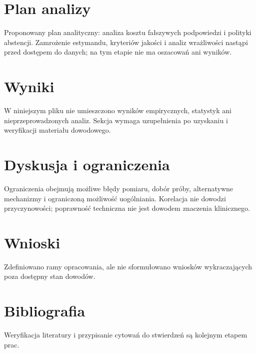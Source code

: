 \documentclass[11pt,a4paper]{article}
\begin{document}
\section{Plan analizy}

Proponowany plan analityczny: analiza kosztu fałszywych podpowiedzi i polityki abstencji. Zamrożenie estymandu, kryteriów jakości i analiz wrażliwości nastąpi przed dostępem do danych; na tym etapie nie ma oszacowań ani wyników.

\section{Wyniki}

W niniejszym pliku nie umieszczono wyników empirycznych, statystyk ani nieprzeprowadzonych analiz. Sekcja wymaga uzupełnienia po uzyskaniu i weryfikacji materiału dowodowego.

\section{Dyskusja i ograniczenia}

Ograniczenia obejmują możliwe błędy pomiaru, dobór próby, alternatywne mechanizmy i ograniczoną możliwość uogólniania. Korelacja nie dowodzi przyczynowości; poprawność techniczna nie jest dowodem znaczenia klinicznego.

\section{Wnioski}

Zdefiniowano ramy opracowania, ale nie sformułowano wniosków wykraczających poza dostępny stan dowodów.

\section*{Bibliografia}

Weryfikacja literatury i przypisanie cytowań do stwierdzeń są kolejnym etapem prac.
\end{document}
